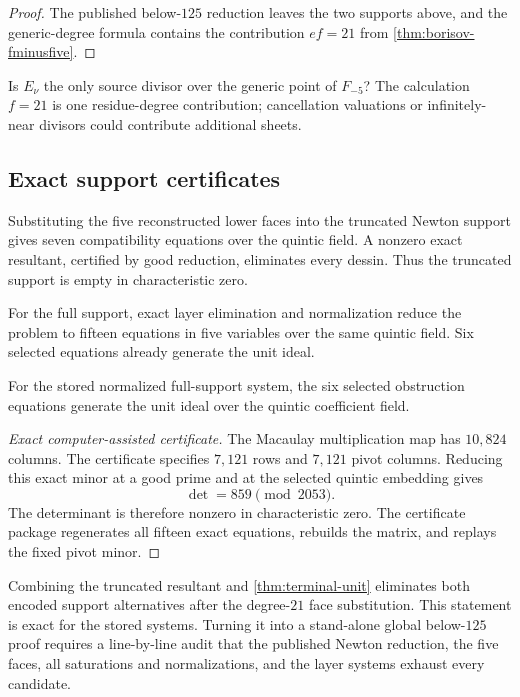 \begin{proof}
The published below-\(125\) reduction leaves the two supports above, and the
generic-degree formula contains the contribution \(ef=21\) from
\cref{thm:borisov-fminusfive}.
\end{proof}

\begin{question}
Is \(E_\nu\) the only source divisor over the generic point of \(F_{-5}\)?
The calculation \(f=21\) is one residue-degree contribution; cancellation
valuations or infinitely-near divisors could contribute additional sheets.
\end{question}

\subsection{Exact support certificates}

Substituting the five reconstructed lower faces into the truncated Newton
support gives seven compatibility equations over the quintic field.  A
nonzero exact resultant, certified by good reduction, eliminates every
dessin.  Thus the truncated support is empty in characteristic zero.

For the full support, exact layer elimination and normalization reduce the
problem to fifteen equations in five variables over the same quintic field.
Six selected equations already generate the unit ideal.

\begin{theorem}
\label{thm:terminal-unit}
For the stored normalized full-support system, the six selected obstruction
equations generate the unit ideal over the quintic coefficient field.
\end{theorem}

\begin{proof}[Exact computer-assisted certificate]
The Macaulay multiplication map has \(10{,}824\) columns.  The certificate
specifies \(7{,}121\) rows and \(7{,}121\) pivot columns.  Reducing this
exact minor at a good prime and at the selected quintic embedding gives
\[
\det=859\pmod{2053}.
\]
The determinant is therefore nonzero in characteristic zero.  The
certificate package regenerates all fifteen exact equations, rebuilds the
matrix, and replays the fixed pivot minor.
\end{proof}

Combining the truncated resultant and
\cref{thm:terminal-unit} eliminates both encoded support alternatives after
the degree-\(21\) face substitution.  This statement is exact for the stored
systems.  Turning it into a stand-alone global below-\(125\) proof requires
a line-by-line audit that the published Newton reduction, the five faces,
all saturations and normalizations, and the layer systems exhaust every
candidate.

